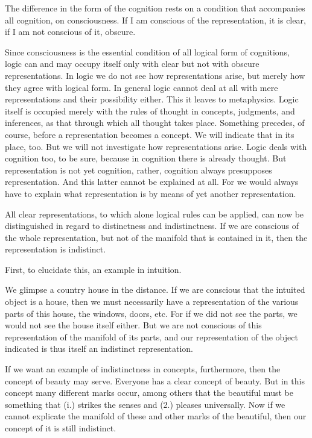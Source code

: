     The difference in the form of the cognition rests on
    a condition that accompanies all cognition, on consciousness.
    If I am conscious of the representation, it is clear,
    if I am not conscious of it, obscure.

        Since consciousness is the essential condition
        of all logical form of cognitions,
        logic can and may occupy itself only with clear
        but not with obscure representations.
        In logic we do not see how representations arise,
        but merely how they agree with logical form.
        In general logic cannot deal at all
        with mere representations
        and their possibility either.
        This it leaves to metaphysics.
        Logic itself is occupied merely
        with the rules of thought in
        concepts, judgments, and inferences,
        as that through which all thought takes place.
        Something precedes, of course,
        before a representation becomes a concept.
        We will indicate that in its place, too.
        But we will not investigate how representations arise.
        Logic deals with cognition too, to be sure,
        because in cognition there is already thought.
        But representation is not yet cognition, rather,
        cognition always presupposes representation.
        And this latter cannot be explained at all.
        For we would always have to
        explain what representation is
        by means of yet another representation.

    All clear representations,
    to which alone logical rules can be applied,
    can now be distinguished in regard to
    distinctness and indistinctness.
    If we are conscious of the whole representation,
    but not of the manifold that is contained in it,
    then the representation is indistinct.

        First, to elucidate this, an example in intuition.

        We glimpse a country house in the distance.
        If we are conscious that the intuited object is a house,
        then we must necessarily have a representation of
        the various parts of this house, the windows, doors, etc.
        For if we did not see the parts,
        we would not see the house itself either.
        But we are not conscious of this
        representation of the manifold of its parts,
        and our representation of the object indicated is
        thus itself an indistinct representation.

        If we want an example of indistinctness in concepts, furthermore,
        then the concept of beauty may serve.
        Everyone has a clear concept of beauty.
        But in this concept many different marks occur,
        among others that the beautiful must be something that
        (i.) strikes the senses and
        (2.) pleases universally.
        Now if we cannot explicate the manifold of these
        and other marks of the beautiful,
        then our concept of it is still indistinct.

